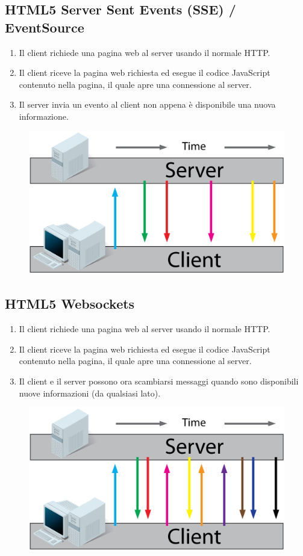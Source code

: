 \subsection{HTML5 Server Sent Events (SSE) / EventSource}
\begin{enumerate}
	\item Il client richiede una pagina web al server usando il normale HTTP.
	\item Il client riceve la pagina web richiesta ed esegue il codice JavaScript contenuto nella pagina, il quale apre una connessione al server.
	\item Il server invia un evento al client non appena è disponibile una nuova informazione.
\end{enumerate}
\begin{figure}[h]
	\centering
	\includegraphics[scale=0.4]{Immagini/server_sent_events.png}
\end{figure}
\newpage
\subsection{HTML5 Websockets}
\begin{enumerate}
	\item Il client richiede una pagina web al server usando il normale HTTP.
	\item Il client riceve la pagina web richiesta ed esegue il codice JavaScript contenuto nella pagina, il quale apre una connessione al server.
	\item Il client e il server possono ora scambiarsi messaggi quando sono disponibili nuove informazioni (da qualsiasi lato).
\end{enumerate}
\begin{figure}[h]
	\centering
	\includegraphics[scale=0.4]{Immagini/websockets.png}
\end{figure}